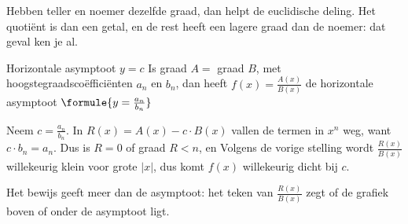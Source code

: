 Hebben teller en noemer dezelfde graad, dan helpt de euclidische deling. Het quotiënt is dan een getal, en de rest heeft een lagere graad dan de noemer: dat geval ken je al.

\begin{theorie}
\begin{stelling}{Horizontale asymptoot $y = c$}
Is graad $A =$ graad $B$, met hoogstegraadscoëfficiënten $a_n$ en $b_n$, dan heeft $f(x) = \frac{A(x)}{B(x)}$ de horizontale asymptoot \quad $\formule{y = \frac{a_n}{b_n}}$
\end{stelling}

\begin{bewijs}
Neem $c = \frac{a_n}{b_n}$. In $R(x) = A(x) - c \cdot B(x)$ vallen de termen in $x^n$ weg, want $c \cdot b_n = a_n$. Dus is $R = 0$ of graad $R < n$, en
Volgens de vorige stelling wordt $\frac{R(x)}{B(x)}$ willekeurig klein voor grote $|x|$, dus komt $f(x)$ willekeurig dicht bij $c$.
\end{bewijs}
\end{theorie}

Het bewijs geeft meer dan de asymptoot: het teken van $\frac{R(x)}{B(x)}$ zegt of de grafiek boven of onder de asymptoot ligt.


\begin{oefeningen}
\end{oefeningen}

